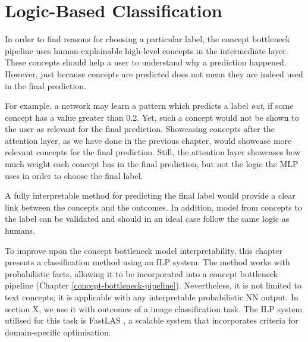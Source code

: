 \chapter{Logic-Based Classification}
\label{logic-based-classification}


In order to find reasons for choosing a particular label, the concept bottleneck pipeline \cite{RefWorks:RefID:35-koh2020concept} uses human-explainable high-level concepts in the intermediate layer.
These concepts should help a user to understand why a prediction happened.
However, just because concepts are predicted does not mean they are indeed used in the final prediction.

For example, a network may learn a pattern which predicts a label \emph{out}, if some concept has a value greater than 0.2.
Yet, such a concept would not be shown to the user as relevant for the final prediction.
Showcasing concepts after the attention layer, as we have done in the previous chapter, would showcase more relevant concepts for the final prediction.
Still, the attention layer showcases how much weight each concept has in the final prediction, but not the logic the MLP uses in order to choose the final label.

A fully interpretable method for predicting the final label would provide a clear link between the concepts and the outcomes.
In addition, model from concepts to the label can be validated and should in an ideal case follow the same logic as humans.

To improve upon the concept bottleneck model interpretability, this chapter presents a classification method using an ILP system.
The method works with probabilistic facts, allowing it to be incorporated into a concept bottleneck pipeline (Chapter \ref{concept-bottleneck-pipeline}).
Nevertheless, it is not limited to text concepts; it is applicable with any interpretable probabilistic NN output. 
In section X, we use it with outcomes of a image classification task.
The ILP system utilised for this task is FastLAS \cite{RefWorks:RefID:19-law2020fastlas:}, a scalable system that incorporates criteria for domain-specific optimisation.

